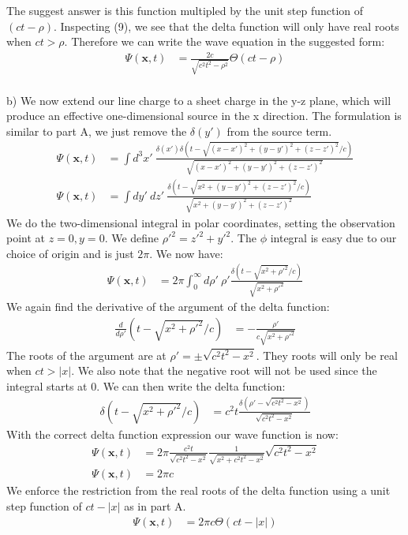 \documentclass[a4paper,11pt]{article}
\numberwithin{equation}{section}
\newcommand{\bv}[1]{\mathbf{#1}}
\begin{document}
The suggest answer is this function multipled by the unit step function of $(ct-\rho)$. 
Inspecting (9), we see that the delta function will only have real roots when $ct>\rho$.
Therefore we can write the wave equation in the suggested form:
\begin{align}
 \Psi(\bv{x},t) &= \frac{2c}{\sqrt{c^2t^2-\rho^2}}\Theta(ct-\rho)
\end{align}
\\
b) We now extend our line charge to a sheet charge in the y-z plane, which will produce an effective one-dimensional source in the x direction.
The formulation is similar to part A, we just remove the $\delta(y')$ from the source term.
\begin{align}
 \Psi(\bv{x},t) &= \int d^3x'\ \frac{\delta(x')\delta(t-\sqrt{(x-x')^2+(y-y')^2+(z-z')^2}/c)}{\sqrt{(x-x')^2+(y-y')^2+(z-z')^2}}\\
 \Psi(\bv{x},t) &= \int dy'\ dz'\ \frac{\delta(t-\sqrt{x^2+(y-y')^2+(z-z')^2}/c)}{\sqrt{x^2+(y-y')^2+(z-z')^2}}
\end{align}
We do the two-dimensional integral in polar coordinates, setting the observation point at $z=0,y=0$. We define $\rho'^2 = z'^2+y'^2$. 
The $\phi$ integral is easy due to our choice of origin and is just $2\pi$.
We now have:
\begin{align}
 \Psi(\bv{x},t) &= 2\pi \int_0^\infty d\rho'\ \rho'\frac{\delta(t-\sqrt{x^2+\rho'^2}/c)}{\sqrt{x^2+\rho'^2}}
\end{align}
We again find the derivative of the argument of the delta function:
\begin{align}
 \frac{d}{d\rho'}(t-\sqrt{x^2+\rho'^2}/c) &= -\frac{\rho'}{c\sqrt{x^2+\rho'^2}}
\end{align}
The roots of the argument are at $\rho' = \pm \sqrt{c^2t^2-x^2}$.
They roots will only be real when $ct>|x|$. 
We also note that the negative root will not be used since the integral starts at 0.
We can then write the delta function:
\begin{align}
 \delta(t-\sqrt{x^2+\rho'^2}/c) &= c^2t\frac{\delta(\rho'-\sqrt{c^2t^2-x^2})}{\sqrt{c^2t^2-x^2}}
\end{align}
With the correct delta function expression our wave function is now:
\begin{align}
 \Psi(\bv{x},t) &= 2\pi \frac{c^2t}{\sqrt{c^2t^2-x^2}} \frac{1}{\sqrt{x^2+c^2t^2-x^2}}\sqrt{c^2t^2-x^2}\\
 \Psi(\bv{x},t) &= 2\pi c
\end{align}
We enforce the restriction from the real roots of the delta function using a unit step function of $ct-|x|$ as in part A.
\begin{align}
 \Psi(\bv{x},t) &= 2\pi c \Theta(ct-|x|)
\end{align}
\end{document}
